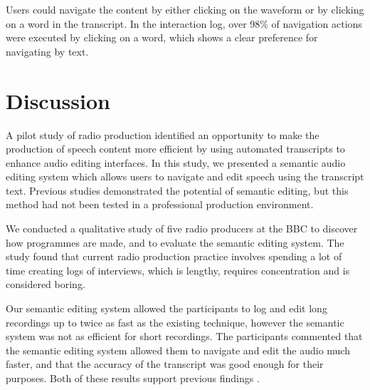 Users could navigate the content by either clicking on the waveform or by
clicking on a word in the transcript. In the interaction log, over 98\% of
navigation actions were executed by clicking on a word, which shows a clear
preference for navigating by text.





\section{Discussion}


A pilot study of radio production identified an opportunity to make the
production of speech content more efficient by using automated transcripts to
enhance audio editing interfaces. In this study, we presented a semantic audio
editing system which allows users to navigate and edit speech using the
transcript text.  Previous studies \cite{Whittaker2004, Rubin2013} demonstrated
the potential of semantic editing, but this method had not been tested in a
professional production environment.

We conducted a qualitative study of five radio producers at the BBC to discover
how programmes are made, and to evaluate the semantic editing system. The study
found that current radio production practice involves spending a lot of time
creating logs of interviews,
which is lengthy, requires concentration and is considered
boring.

Our semantic editing system allowed the participants to log and edit long
recordings up to twice as fast as the existing technique, however the semantic
system was not as efficient for short recordings. The participants commented
that the semantic editing system allowed them to navigate and edit the audio
much faster, and that the accuracy of the transcript was good enough for their
purposes. Both of these results support previous findings
\cite{Whittaker2004,Rubin2013}.

